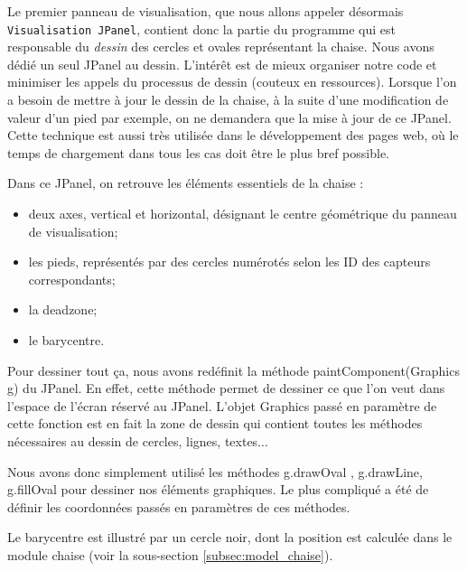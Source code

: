 \documentclass{polytech/polytech}
\begin{document}
Le premier panneau de visualisation, que nous allons appeler désormais \texttt{Visualisation JPanel}, contient donc la partie du programme qui est responsable du \textit{dessin} des cercles et ovales représentant la chaise.
Nous avons dédié un seul JPanel au dessin.
L'intérêt est de mieux organiser notre code et minimiser les appels du processus de dessin (couteux en ressources). 
Lorsque l'on a besoin de mettre à jour le dessin de la chaise, à la suite d'une modification de valeur d'un pied par exemple, on ne demandera que la mise à jour de ce JPanel.
Cette technique est aussi très utilisée dans le développement des pages web, où le temps de chargement dans tous les cas doit être le plus bref possible.

Dans ce JPanel, on retrouve les éléments essentiels de la chaise : 

\begin{itemize}
\item deux axes, vertical et horizontal, désignant le centre géométrique du panneau de visualisation;
\item les pieds, représentés par des cercles numérotés selon les ID des capteurs correspondants;
\item la deadzone;
\item le barycentre. 
\end{itemize}

Pour dessiner tout ça, nous avons redéfinit la méthode paintComponent(Graphics g) du JPanel. En effet, cette méthode permet de dessiner ce que l'on veut dans l'espace de l'écran réservé au JPanel. L'objet Graphics passé en paramètre de cette fonction est en fait la zone de dessin qui contient toutes les méthodes nécessaires au dessin de cercles, lignes, textes...

Nous avons donc simplement utilisé les méthodes g.drawOval , g.drawLine, g.fillOval pour dessiner nos éléments graphiques.
Le plus compliqué a été de définir les coordonnées passés en paramètres de ces méthodes.

Le barycentre est illustré par un cercle noir, dont la position est calculée dans le module chaise (voir la sous-section \ref{subsec:model_chaise}). 
\end{document}
